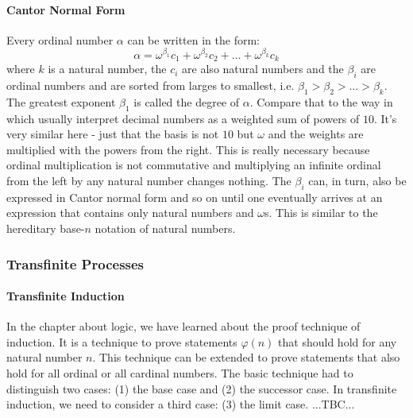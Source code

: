 \paragraph{Cantor Normal Form}
Every ordinal number $\alpha$ can be written in the form:
\begin{equation}
\alpha = \omega^{\beta_1} c_1 + \omega^{\beta_2} c_2 + \ldots + \omega^{\beta_k} c_k
\end{equation}
where $k$ is a natural number, the $c_i$ are also natural numbers and the $\beta_i$ are ordinal numbers and are sorted from larges to smallest, i.e. $\beta_1 > \beta_2 > \ldots > \beta_k$. The greatest exponent $\beta_1$ is called the degree of $\alpha$. Compare that to the way in which usually interpret decimal numbers as a weighted sum of powers of $10$. It's very similar here - just that the basis is not $10$ but $\omega$ and the weights are multiplied with the powers from the right. This is really necessary because ordinal multiplication is not commutative and multiplying an infinite ordinal from the left by any natural number changes nothing. The $\beta_i$ can, in turn, also be expressed in Cantor normal form and so on until one eventually arrives at an expression that contains only natural numbers and $\omega$s. This is similar to the hereditary base-$n$ notation of natural numbers.





\subsubsection{Transfinite Processes}

\paragraph{Transfinite Induction}
In the chapter about logic, we have learned about the proof technique of induction. It is a technique to prove statements $\varphi(n)$ that should hold for any natural number $n$. This technique can be extended to prove statements that also hold for all ordinal or all cardinal numbers. The basic technique had to distinguish two cases: (1) the base case and (2) the successor case. In transfinite induction, we need to consider a third case: (3) the limit case. ...TBC...

